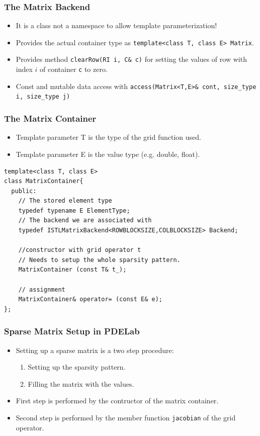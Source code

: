 \begin{frame}
  \frametitle<presentation>{The Matrix Backend}
  \begin{itemize}
  \item It is a class not a namespace to allow template
    parameterization!
  \item Provides the actual container type as
    \lstinline!template<class T, class E> Matrix!.
  \item Provides method \lstinline!clearRow(RI i, C& c)! for setting
    the values of row with index $i$ of container \lstinline!c! to
    zero.
    \item Const and mutable data access with 
    \lstinline!access(Matrix<T,E>& cont, size_type i, size_type j)!
  \end{itemize}
\end{frame}

\begin{frame}[fragile]
  \frametitle{The Matrix Container}
\begin{itemize}
  \item Template parameter T is the type of the grid function used.
  \item Template parameter E is the value type (e.g. double, float).
  \end{itemize}
  \begin{lstlisting}[basicstyle=\scriptsize]
template<class T, class E>
class MatrixContainer{
  public:
    // The stored element type
    typedef typename E ElementType;
    // The backend we are associated with
    typedef ISTLMatrixBackend<ROWBLOCKSIZE,COLBLOCKSIZE> Backend;
      
    //constructor with grid operator t
    // Needs to setup the whole sparsity pattern.
    MatrixContainer (const T& t_);
      
    // assignment
    MatrixContainer& operator= (const E& e);
};
  \end{lstlisting}
\end{frame}
\begin{frame}[fragile]
  \frametitle{Sparse Matrix Setup in PDELab}
  \begin{itemize}
  \item Setting up a sparse matrix is a two step procedure:
    \begin{enumerate}
    \item Setting up the sparsity pattern.
    \item Filling the matrix with the values.
    \end{enumerate}
  \item First step is performed by the contructor of the matrix
    container.
  \item Second step is performed by the member function
    \lstinline!jacobian! of the grid operator.
  \end{itemize}

\end{frame}


